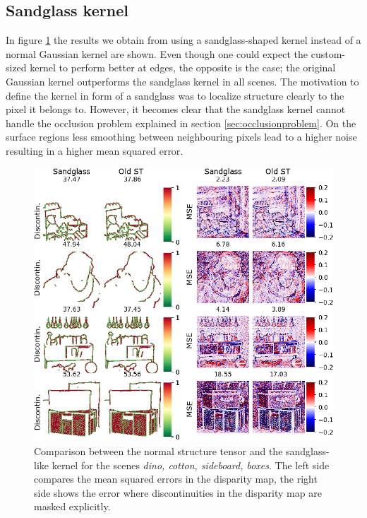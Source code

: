 \documentclass  [
  paper    = a4,
  BCOR     = 10mm,
  twoside,
  fontsize = 12pt,
  fleqn,
  toc      = bibnumbered,
  toc      = listofnumbered,
  numbers  = noendperiod,
  headings = normal,
  listof   = leveldown,
  version  = 3.03
]                                       {scrreprt}
\begin{document}
\subsection{Sandglass kernel}
In figure \ref{fig:sandclockresults} the results we obtain from using a sandglass-shaped kernel instead of a normal Gaussian kernel are shown. Even though one could expect the custom-sized kernel to perform better at edges, the opposite is the case; the original Gaussian kernel outperforms the sandglass kernel in all scenes. The motivation to define the kernel in form of a sandglass was to localize structure clearly to the pixel it belongs to. However, it becomes clear that the sandglass kernel cannot handle the occlusion problem explained in section \ref{sec:occlusionproblem}. On the surface regions less smoothing between neighbouring pixels lead to a higher noise resulting in a higher mean squared error. 
\begin{figure}[h!]
	\centering
	\includegraphics[width=0.7\linewidth]{images/sandclock_results}
	\caption[Results with custom sized kernel]{Comparison between the normal structure tensor and the sandglass- like kernel for the scenes \textit{dino, cotton, sideboard, boxes}. The left side compares the mean squared errors in the disparity map, the right side shows the error where discontinuities in the disparity map are masked explicitly.}
	\label{fig:sandclockresults}
\end{figure}
\end{document}
